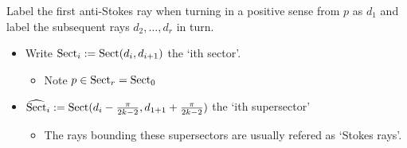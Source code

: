 Label the first anti-Stokes ray when turning in a positive sense from $p$ as
$d_1$ and label the subsequent rays $d_2,\dots,d_r$ in turn.
\begin{itemize}
  \item Write $\operatorname{Sect}_i:= \operatorname{Sect}(d_i,d_{i+1})$ the ‘ith sector’.
  \begin{itemize}
    \item Note $p \in\operatorname{Sect}_r= \operatorname{Sect}_0$
  \end{itemize}
  \item $\widehat{\operatorname{Sect}}_i:=
    \operatorname{Sect}(d_i-\frac{\pi}{2k-2},d_{1+1}+\frac{\pi}{2k-2})$ the ‘ith supersector’
    \begin{itemize}
      \item The rays bounding these supersectors are usually refered as
        \textcolor{red!40!black}{‘Stokes rays’}.
    \end{itemize}
\end{itemize}
